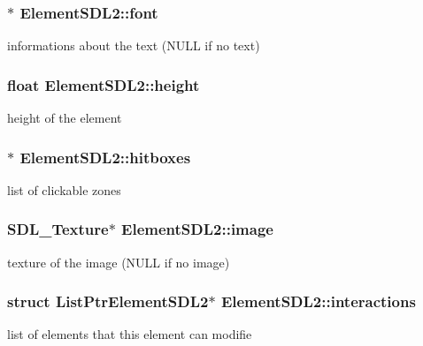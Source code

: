 \subsubsection[{\texorpdfstring{font}{font}}]{$\ast$ Element\+S\+D\+L2\+::font}\hypertarget{structElementSDL2_a0379d0d8d499b3916a191b65f2d23f3d}{}\label{structElementSDL2_a0379d0d8d499b3916a191b65f2d23f3d}
informations about the text (N\+U\+LL if no text) 
\subsubsection[{\texorpdfstring{height}{height}}]{\setlength{\rightskip}{0pt plus 5cm}float Element\+S\+D\+L2\+::height}\hypertarget{structElementSDL2_aa85848e696ee9420c7993d395ed883be}{}\label{structElementSDL2_aa85848e696ee9420c7993d395ed883be}
height of the element 
\subsubsection[{\texorpdfstring{hitboxes}{hitboxes}}]{$\ast$ Element\+S\+D\+L2\+::hitboxes}\hypertarget{structElementSDL2_aa4af7ab8949d93544da609659a4011c0}{}\label{structElementSDL2_aa4af7ab8949d93544da609659a4011c0}
list of clickable zones 
\subsubsection[{\texorpdfstring{image}{image}}]{\setlength{\rightskip}{0pt plus 5cm}S\+D\+L\+\_\+\+Texture$\ast$ Element\+S\+D\+L2\+::image}\hypertarget{structElementSDL2_aab2ff0fd3a1c4370d7f1f9cdd250d056}{}\label{structElementSDL2_aab2ff0fd3a1c4370d7f1f9cdd250d056}
texture of the image (N\+U\+LL if no image) 
\subsubsection[{\texorpdfstring{interactions}{interactions}}]{\setlength{\rightskip}{0pt plus 5cm}struct {\bf List\+Ptr\+Element\+S\+D\+L2}$\ast$ Element\+S\+D\+L2\+::interactions}\hypertarget{structElementSDL2_aca39f22199862196fc52dfcecafeca4a}{}\label{structElementSDL2_aca39f22199862196fc52dfcecafeca4a}
list of elements that this element can modifie 
